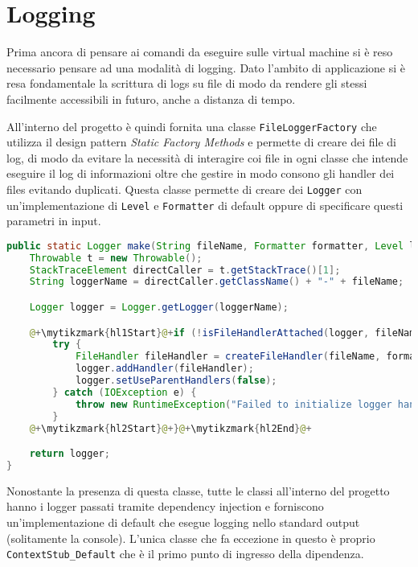 \section{Logging}
Prima ancora di pensare ai comandi da eseguire sulle virtual machine si è reso necessario pensare ad una modalità di logging. Dato l'ambito di applicazione si è resa fondamentale la scrittura di logs su file di modo da rendere gli stessi facilmente accessibili in futuro, anche a distanza di tempo.\par
All'interno del progetto è quindi fornita una classe \texttt{FileLoggerFactory} che utilizza il design pattern \emph{Static Factory Methods} \cite{effectiveJava} e permette di creare dei file di log, di modo da evitare la necessità di interagire coi file in ogni classe che intende eseguire il log di informazioni oltre che gestire in modo consono gli handler dei files evitando duplicati. Questa classe permette di creare dei \texttt{Logger} con un'implementazione di \texttt{Level} e \texttt{Formatter} di default oppure di specificare questi parametri in input.
\begin{lstlisting}[language=Java, caption={Metodo make di FileLoggerFactory}, label=code:FileLoggerFactoryMake]
public static Logger make(String fileName, Formatter formatter, Level level) {
    Throwable t = new Throwable();
    StackTraceElement directCaller = t.getStackTrace()[1];
    String loggerName = directCaller.getClassName() + "-" + fileName;

    Logger logger = Logger.getLogger(loggerName);

    @+\mytikzmark{hl1Start}@+if (!isFileHandlerAttached(logger, fileName)) {@+\mytikzmark{hl1End}@+
        try {
            FileHandler fileHandler = createFileHandler(fileName, formatter, level);
            logger.addHandler(fileHandler);
            logger.setUseParentHandlers(false);
        } catch (IOException e) {
            throw new RuntimeException("Failed to initialize logger handler.", e);
        }
    @+\mytikzmark{hl2Start}@+}@+\mytikzmark{hl2End}@+

    return logger;
}
    \end{lstlisting}
Nonostante la presenza di questa classe, tutte le classi all'interno del progetto hanno i logger passati tramite dependency injection e forniscono un'implementazione di default che esegue logging nello standard output (solitamente la console). L'unica classe che fa eccezione in questo è proprio \texttt{ContextStub\_Default} che è il primo punto di ingresso della dipendenza.\\
